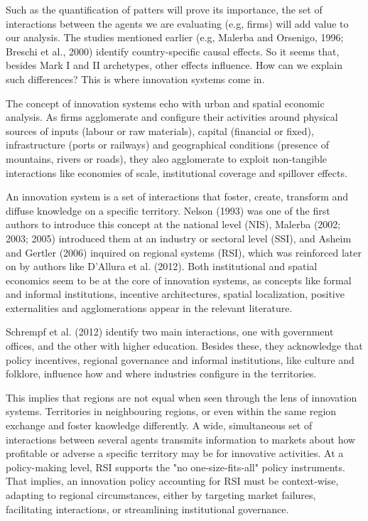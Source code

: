 \documentclass[12pt,a4paper]{article}
\begin{document}
Such as the quantification of patters will prove its importance, the set of interactions between the agents we are evaluating (e.g, firms) will add value to our analysis. The studies mentioned earlier (e.g, Malerba and Orsenigo, 1996; Breschi et al., 2000) identify country-specific causal effects. So it seems that, besides Mark I and II archetypes, other effects influence. How can we explain such differences? This is where innovation systems come in.

The concept of innovation systems echo with urban and spatial economic analysis. As firms agglomerate and configure their activities around physical sources of inputs (labour or raw materials), capital (financial or fixed), infrastructure (ports or railways) and geographical conditions (presence of mountains, rivers or roads), they also agglomerate to exploit non-tangible interactions like economies of scale, institutional coverage and spillover effects. 

 An innovation system is a set of interactions that foster, create, transform and diffuse knowledge on a specific territory. Nelson (1993) was one of the first authors to introduce this concept at the national level (NIS), Malerba (2002; 2003; 2005) introduced them at an industry or sectoral level (SSI), and  Asheim and Gertler (2006) inquired on regional systems (RSI), which was reinforced later on by authors like D’Allura et al. (2012). Both institutional and spatial economics seem to be at the core of innovation systems, as concepts like formal and informal institutions, incentive architectures, spatial localization, positive externalities and agglomerations appear in the relevant literature.

Schrempf et al. (2012) identify two main interactions, one with government offices, and the other with higher education. Besides these, they acknowledge that policy incentives, regional governance and informal institutions, like culture and folklore, influence how and where industries configure in the territories.

This implies that regions are not equal when seen through the lens of innovation systems. Territories in neighbouring regions, or even within the same region exchange and foster knowledge differently. A wide, simultaneous set of interactions between several agents transmits information to markets about how profitable or adverse a specific territory may be for innovative activities. At a policy-making level, RSI supports the "no one‐size‐fits‐all" policy instruments. That implies, an innovation policy accounting for RSI must be context‐wise, adapting to regional circumstances, either by targeting market failures, facilitating interactions, or streamlining institutional governance. 
\end{document}
